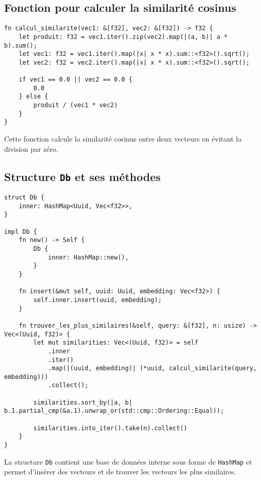 \documentclass[a4paper,11pt]{article}
\begin{document}
\subsection*{Fonction pour calculer la similarité cosinus}
\begin{verbatim}
fn calcul_similarite(vec1: &[f32], vec2: &[f32]) -> f32 {
    let produit: f32 = vec1.iter().zip(vec2).map(|(a, b)| a * b).sum();
    let vec1: f32 = vec1.iter().map(|x| x * x).sum::<f32>().sqrt();
    let vec2: f32 = vec2.iter().map(|x| x * x).sum::<f32>().sqrt();

    if vec1 == 0.0 || vec2 == 0.0 {
        0.0
    } else {
        produit / (vec1 * vec2)
    }
}
\end{verbatim}

Cette fonction calcule la similarité cosinus entre deux vecteurs en évitant la division par zéro.

\subsection*{Structure \texttt{Db} et ses méthodes}
\begin{verbatim}
struct Db {
    inner: HashMap<Uuid, Vec<f32>>,
}

impl Db {
    fn new() -> Self {
        Db {
            inner: HashMap::new(),
        }
    }

    fn insert(&mut self, uuid: Uuid, embedding: Vec<f32>) {
        self.inner.insert(uuid, embedding);
    }

    fn trouver_les_plus_similaires(&self, query: &[f32], n: usize) -> Vec<(Uuid, f32)> {
        let mut similarities: Vec<(Uuid, f32)> = self
            .inner
            .iter()
            .map(|(uuid, embedding)| (*uuid, calcul_similarite(query, embedding)))
            .collect();

        similarities.sort_by(|a, b| b.1.partial_cmp(&a.1).unwrap_or(std::cmp::Ordering::Equal));

        similarities.into_iter().take(n).collect()
    }
}
\end{verbatim}

La structure \texttt{Db} contient une base de données interne sous forme de \texttt{HashMap} et permet d'insérer des vecteurs et de trouver les vecteurs les plus similaires.
\end{document}
